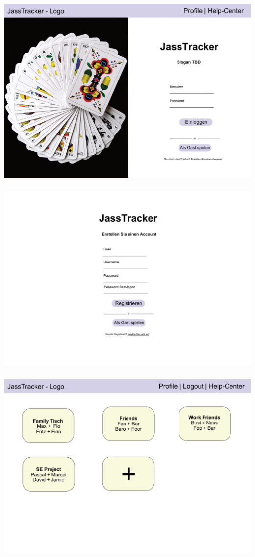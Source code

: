 \includegraphics[height=10cm, width=\textwidth]{resources/mockups/mockup-login}
\includegraphics[height=10cm, width=\textwidth]{resources/mockups/mockup-register}
\includegraphics[height=10cm, width=\textwidth]{resources/mockups/mockup-table-overview}

